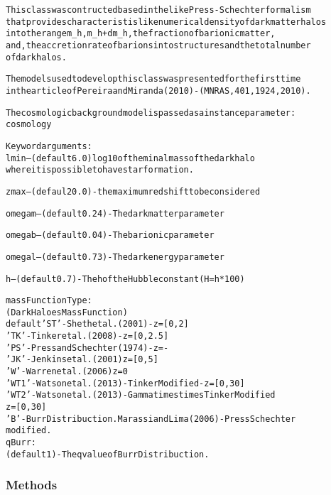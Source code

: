 \begin{alltt}
This class was contructed based in the like Press-Schechter formalism
that provides characteristis like numerical density of dark matter halos
into the range m\_h, m\_h + dm\_h, the fraction of barionic matter,
and,  the accretion rate of barions into structures and the total number
of dark halos.

The models used to develop this class was presented for the first time
in the article of Pereira and Miranda (2010) - (MNRAS, 401, 1924, 2010).

The cosmologic background model is passed as a instance parameter:
    cosmology

Keyword arguments:
    lmin -- (default 6.0) log10 of the minal mass of the dark halo
                        where it is possible to have star formation.

    zmax -- (defaul 20.0) - the maximum redshift to be considered

    omegam -- (default 0.24) - The dark matter parameter

    omegab -- (default 0.04) - The barionic parameter

    omegal -- (default 0.73) - The dark energy parameter

    h -- (default 0.7) - The h of the Hubble constant (H = h * 100)

    massFunctionType:
        (Dark Haloes Mass Function)
        default 'ST' - Sheth et al. (2001) - z=[0,2]
        'TK' - Tinker et al. (2008) - z=[0,2.5]
        'PS' - Press and Schechter (1974) - z=-
        'JK' - Jenkins et al. (2001) z=[0,5]
        'W' - Warren et al. (2006) z=0
        'WT1' - Watson et al. (2013) - Tinker Modified - z=[0,30]
        'WT2' - Watson et al. (2013) - Gamma times times Tinker Modified
                                            z=[0,30]
        'B' - Burr Distribuction. Marassi and Lima (2006) - Press Schechter
                                modified.
    qBurr:
        (default 1) - The q value of Burr Distribuction.
\end{alltt}



  \subsubsection{Methods}

